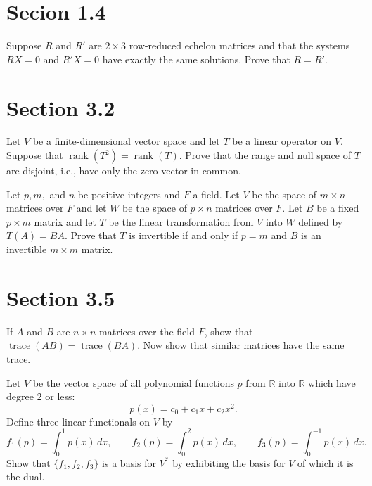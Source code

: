 \section*{Secion 1.4}
\begin{problem}
Suppose $R$ and $R'$ are $2\times 3$ row-reduced echelon matrices and that the systems $R X = 0$ and $R' X = 0$ have exactly the same solutions. Prove that $R=R'$.
\end{problem}

\section*{Section 3.2}

\begin{problem}
Let $V$ be a finite-dimensional vector space and let $T$ be a linear operator on $V$. Suppose that $\operatorname{rank}(T^{2})=\operatorname{rank}(T)$. Prove that the range and null space of $T$ are disjoint, i.e., have only the zero vector in common.
\end{problem}

\begin{problem}
Let $p,m,$ and $n$ be positive integers and $F$ a field. Let $V$ be the space of $m\times n$ matrices over $F$ and let $W$ be the space of $p\times n$ matrices over $F$. Let $B$ be a fixed $p\times m$ matrix and let $T$ be the linear transformation from $V$ into $W$ defined by $T(A)=BA$. Prove that $T$ is invertible if and only if $p=m$ and $B$ is an invertible $m\times m$ matrix.
\end{problem}

\section*{Section 3.5}
\begin{problem}
If $A$ and $B$ are $n\times n$ matrices over the field $F$, show that $\operatorname{trace}(AB)=\operatorname{trace}(BA)$. Now show that similar matrices have the same trace.
\end{problem}

\begin{problem}
Let $V$ be the vector space of all polynomial functions $p$ from $\mathbb{R}$ into $\mathbb{R}$ which have degree $2$ or less:
\[
p(x)=c_0 + c_1 x + c_2 x^2.
\]
Define three linear functionals on $V$ by
\[
f_1(p)=\int_0^1 p(x)\,dx,\qquad
f_2(p)=\int_0^2 p(x)\,dx,\qquad
f_3(p)=\int_{0}^{-1} p(x)\,dx.
\]
Show that $\{f_1,f_2,f_3\}$ is a basis for $V^*$ by exhibiting the basis for $V$ of which it is the dual.
\end{problem}